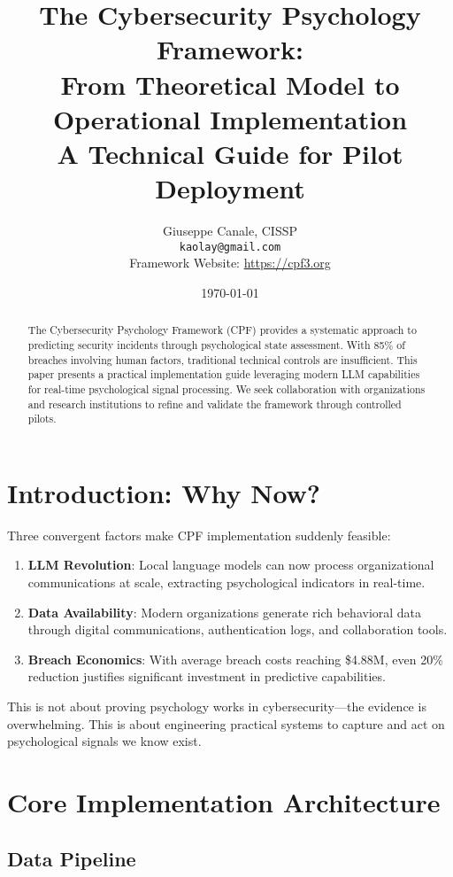 \documentclass[11pt,a4paper]{article}
\title{The Cybersecurity Psychology Framework:\\
From Theoretical Model to Operational Implementation\\
\large{A Technical Guide for Pilot Deployment}}
\author{Giuseppe Canale, CISSP\\
\texttt{kaolay@gmail.com}\\
Framework Website: \url{https://cpf3.org}}
\date{\today}
\begin{document}
\maketitle

\begin{abstract}
The Cybersecurity Psychology Framework (CPF) provides a systematic approach to 
predicting security incidents through psychological state assessment. With 85\% 
of breaches involving human factors, traditional technical controls are 
insufficient. This paper presents a practical implementation guide leveraging 
modern LLM capabilities for real-time psychological signal processing. We seek 
collaboration with organizations and research institutions to refine and 
validate the framework through controlled pilots.
\end{abstract}

\section{Introduction: Why Now?}

Three convergent factors make CPF implementation suddenly feasible:

\begin{enumerate}
\item \textbf{LLM Revolution}: Local language models can now process organizational 
communications at scale, extracting psychological indicators in real-time.

\item \textbf{Data Availability}: Modern organizations generate rich behavioral 
data through digital communications, authentication logs, and collaboration tools.

\item \textbf{Breach Economics}: With average breach costs reaching \$4.88M, 
even 20\% reduction justifies significant investment in predictive capabilities.
\end{enumerate}

This is not about proving psychology works in cybersecurity—the evidence is 
overwhelming. This is about engineering practical systems to capture and act 
on psychological signals we know exist.

\section{Core Implementation Architecture}

\subsection{Data Pipeline}
\end{document}
